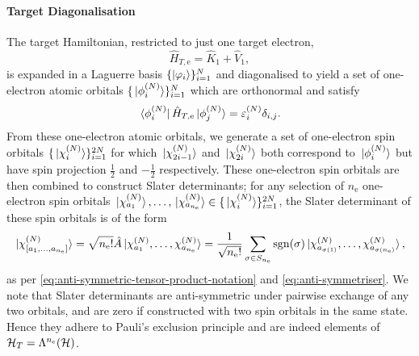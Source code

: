 \documentclass[]{article}
\begin{document}
\paragraph{Target Diagonalisation}
\label{sec:th-ccc-target-diag}

The target Hamiltonian, restricted to just one target electron,
\begin{equation}
  \label{eq:target-1e-hamiltonian}
  \hat{H}_{T, \mathrm{e}}^{}
  =
  \hat{K}_{1}
  +
  \hat{V}_{1}
  ,
\end{equation}
is expanded in a Laguerre basis $\lbrace\ket{\varphi_{i}}\rbrace_{i = 1}^{N}$ and
diagonalised to yield a set of one-electron atomic orbitals
$\lbrace\ket*{\phi_{i}^{(N)}}\rbrace_{i = 1}^{N}$ which are orthonormal and
satisfy
\begin{equation}
  \label{eq:target-1e-orbitals}
  \bra*{\phi_{i}^{(N)}}
  \hat{H}_{T, \mathrm{e}}
  \ket*{\phi_{j}^{(N)}}
  =
  \varepsilon_{i}^{(N)}
  \delta_{i, j}
  .
\end{equation}
From these one-electron atomic orbitals, we generate a set of one-electron spin
orbitals $\lbrace\ket*{\chi_{i}^{(N)}}\rbrace_{i = 1}^{2N}$ for which
$\ket*{\chi_{2i - 1}^{(N)}}$ and $\ket*{\chi_{2i}^{(N)}}$ both correspond
to $\ket*{\phi_{i}^{(N)}}$ but have spin projection $\tfrac{1}{2}$ and
$-\tfrac{1}{2}$ respectively.
These one-electron spin orbitals are then combined to construct Slater
determinants; for any selection of $n_{\mathrm{e}}$ one-electron spin orbitals
$\ket*{\chi_{a_{1}}^{(N)}}, \dotsc, \ket*{\chi_{a_{n_{\mathrm{e}}}}^{(N)}}
\in \lbrace\ket*{\chi_{i}^{(N)}}\rbrace_{i = 1}^{2N}$, the Slater determinant of
these spin orbitals is of the form
\begin{equation}
  \label{eq:target-slater-determinant}
  \ket*{\chi_{[a_{1}, \dotsc, a_{n_{\mathrm{e}}}]}^{(N)}}
  =
  \sqrt{n_{\mathrm{e}}!}
  \hat{A}
  \ket*
  {
    \chi_{a_{1}}^{(N)},
    \dotsc,
    \chi_{a_{n_{\mathrm{e}}}}^{(N)}
  }
  =
  \dfrac{1}{\sqrt{n_{\mathrm{e}}!}}
  \sum_{\sigma \in S_{n_{\mathrm{e}}}}
  \mathrm{sgn}(\sigma)
  \ket*
  {
    \chi_{a_{\sigma(1)}}^{(N)}
    ,
    \dots
    ,
    \chi_{a_{\sigma(n_{\mathrm{e}})}}^{(N)}
  }
  ,
\end{equation}
as per \eqref{eq:anti-symmetric-tensor-product-notation} and
\eqref{eq:anti-symmetriser}.
We note that Slater determinants are anti-symmetric under pairwise exchange of
any two orbitals, and are zero if constructed with two spin orbitals in the same
state.
Hence they adhere to Pauli's exclusion principle and are indeed elements
of $\mathcal{H}_{T} = \Lambda^{n_{\mathrm{e}}}(\mathcal{H})$.
\end{document}
